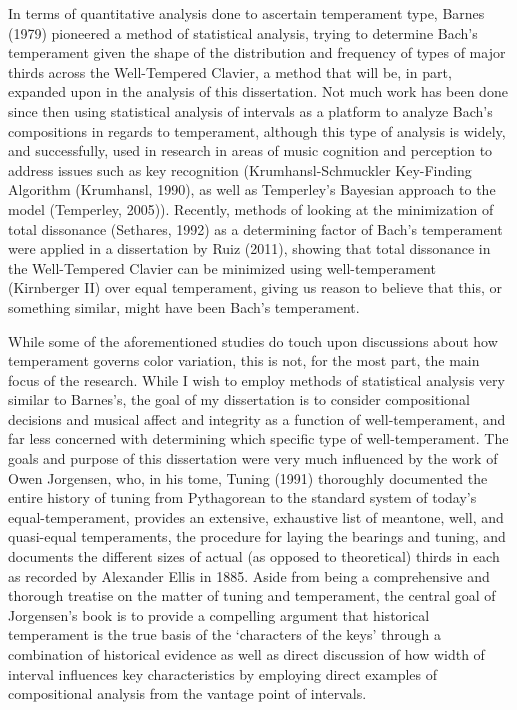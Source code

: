 In terms of quantitative analysis done to ascertain temperament type,
Barnes (1979) pioneered a method of statistical analysis, trying to
determine Bach's temperament given the shape of the distribution and
frequency of types of major thirds across the Well-Tempered Clavier, a
method that will be, in part, expanded upon in the analysis of this
dissertation. Not much work has been done since then using statistical
analysis of intervals as a platform to analyze Bach's compositions in
regards to temperament, although this type of analysis is widely, and
successfully, used in research in areas of music cognition and
perception to address issues such as key recognition
(Krumhansl-Schmuckler Key-Finding Algorithm (Krumhansl, 1990), as well
as Temperley's Bayesian approach to the model (Temperley, 2005)).
Recently, methods of looking at the minimization of total dissonance
(Sethares, 1992) as a determining factor of Bach's temperament were
applied in a dissertation by Ruiz (2011), showing that total dissonance
in the Well-Tempered Clavier can be minimized using well-temperament
(Kirnberger II) over equal temperament, giving us reason to believe that
this, or something similar, might have been Bach's temperament.

While some of the aforementioned studies do touch upon discussions about
how temperament governs color variation, this is not, for the most part,
the main focus of the research. While I wish to employ methods of
statistical analysis very similar to Barnes's, the goal of my
dissertation is to consider compositional decisions and musical affect
and integrity as a function of well-temperament, and far less concerned
with determining which specific type of well-temperament. The goals and
purpose of this dissertation were very much influenced by the work of
Owen Jorgensen, who, in his tome, Tuning (1991) thoroughly documented
the entire history of tuning from Pythagorean to the standard system of
today's equal-temperament, provides an extensive, exhaustive list of
meantone, well, and quasi-equal temperaments, the procedure for laying
the bearings and tuning, and documents the different sizes of actual (as
opposed to theoretical) thirds in each as recorded by Alexander Ellis in
1885. Aside from being a comprehensive and thorough treatise on the
matter of tuning and temperament, the central goal of Jorgensen's book
is to provide a compelling argument that historical temperament is the
true basis of the `characters of the keys' through a combination of
historical evidence as well as direct discussion of how width of
interval influences key characteristics by employing direct examples of
compositional analysis from the vantage point of intervals.

